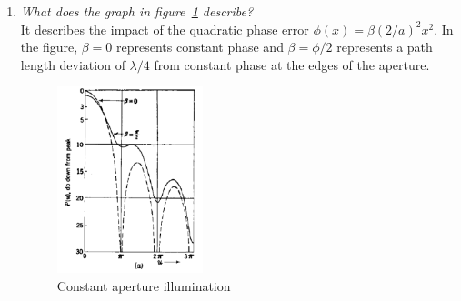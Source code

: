 \documentclass[11pt,a4paper]{article}
\begin{document}
\begin{enumerate}
    
    \item \emph{What does the graph in figure~\ref{fig:quadratic-phase-error-constant} describe?}\\
    It describes the impact of the quadratic phase error $\phi(x) = \beta (2/a)^2 x^2$. In the figure, $\beta = 0$ represents constant phase and $\beta = \phi/2$ represents a path length deviation of $\lambda/4$ from constant phase at the edges of the aperture.
    \begin{figure}[!ht]
        \centering
        \includegraphics[width=0.4\textwidth]{src/what-is-this-graph.png}
        \caption{\label{fig:quadratic-phase-error-constant}Constant aperture illumination}
    \end{figure}
\end{enumerate}
\end{document}
